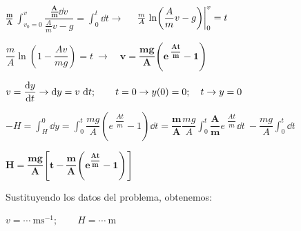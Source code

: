 $\boldsymbol{\frac m A} \displaystyle  \ \int_{v_0=0}^{v} {\dfrac{\boldsymbol{\frac A m} \dd v}{\frac A m v - g}}=\int_0^t \dd t \to $ 
$\quad \frac m A  \displaystyle \eval{ \ln(\frac A m v - g) }_0^v=t$

$\dfrac m A \ln \left( 1-\dfrac{Av}{mg} \right)=t \ \to \quad \boxed{\boldsymbol{v=\dfrac{mg}{A} \left( e\ ^{\dfrac {At}{m} }-1 \right)}}$

$v=\displaystyle \dv{y}{t} \to \dd y= v\ \dd t; \qquad t=0 \to y(0)=0;\quad t\to y=0$

$-H=\displaystyle \int_{H}^0 \dd y = \int_0^t \dfrac{mg}{A} \left( e\ ^{\dfrac {At}{m} }-1 \right) \dd t =
   \boldsymbol{\dfrac m A} \dfrac{mg}{A}  \int_0^t  \boldsymbol{\dfrac A m} e\ ^{\dfrac {At}{m} } \dd t  \ -
   \dfrac{mg}{A} \int_0^t  \dd t 
$

$\boxed{ \boldsymbol{ H= \dfrac{mg}{A} \left[ t - \dfrac m A \left( e^{\dfrac{At}{m}}-1 \right) \right] } }$

Sustituyendo los datos del problema, obtenemos: 

$v= \cdots \ \mathrm{ms}^{-1}; \qquad H= \cdots \ \mathrm{m}$




\newpage %

